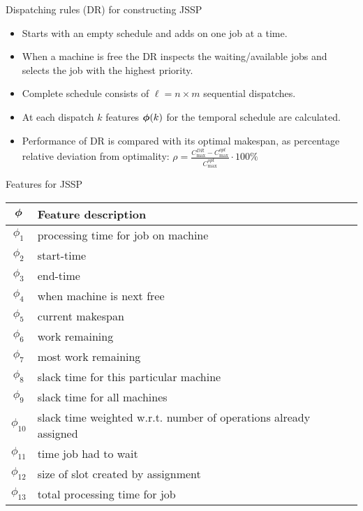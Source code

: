 \documentclass[xcolor=pdftex,t,11pt,handout]{beamer}
\begin{document}
{\begin{block}{Dispatching rules (DR) for constructing JSSP}
\begin{itemize}
	\item Starts with an empty schedule and adds on one job at a time. 
	\item When a machine is free the DR inspects the waiting/available jobs and selects the job with the \alert{highest priority}. 
	\item Complete schedule consists of $\ell=n\times m$ sequential dispatches.
	\item At each dispatch $k$ features ${\boldsymbol{\phi}}(k)$ for the temporal schedule are calculated.
	\item Performance of DR is compared with its optimal makespan, as percentage relative deviation from optimality: $\rho=\frac{C_{\max}^{DR}-C_{\max}^{opt}}{C_{\max}^{opt}}\cdot 100\%$
\end{itemize}
\end{block}
\framebreak
\begin{block}{Features for JSSP}\label{tbl:features}
\begin{table}[t!]
 {\scriptsize
 \begin{center}
  \begin{tabular}{|c|l|}
   \hline\hline
  ${\boldsymbol{\phi}}$ & Feature description \\ \hline
  $\phi_1$ & processing time for job on machine\\
  $\phi_2$ & start-time \\
  $\phi_3$ & end-time \\
  $\phi_4$ & when machine is next free \\
  $\phi_5$ & current makespan \\
  $\phi_6$ & work remaining \\
  $\phi_7$ & most work remaining \\
  $\phi_8$ & slack time for this particular machine \\
  $\phi_9$ & slack time for all machines \\
  $\phi_{10}$ & slack time weighted w.r.t. number of operations already assigned \\
  $\phi_{11}$ & time job had to wait\\
  $\phi_{12}$ & size of slot created by assignment \\
  $\phi_{13}$ & total processing time for job \\
 \hline\hline
  \end{tabular}
 \end{center}}
\end{table}
\end{block}
}
\end{document}
